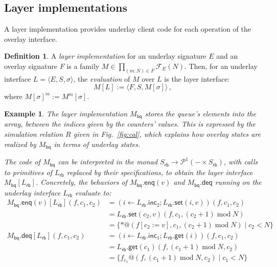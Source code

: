 \documentclass[11pt,oneside,draft]{book}
\newtheorem{example}[theorem]{Example}
\theoremstyle{definition}
\newtheorem{definition}[theorem]{Definition}
\newcommand{\kw}[1]{\ensuremath{ \mathsf{#1} }}
\begin{document}

\subsection{Layer implementations} %

A layer implementation provides underlay client code
for each operation of the overlay interface.

\begin{definition}
A \emph{layer implementation}
for an underlay signature $E$ and
an overlay signature $F$
is a family $M \in \prod_{(m:N) \in F} \mathcal{F}_E(N)$.
Then,
for an underlay interface $L = \langle E, S, \sigma \rangle$,
the \emph{evaluation} of $M$ over $L$ is
the layer interface:
\[
  M[L] := \langle F, S, M[\sigma] \rangle \,,
\]
where $M[\sigma]^m := M^m[\sigma]$.
\end{definition}

\begin{example} \label{ex:bqimpl} %
The layer implementation $M_\kw{bq}$ 
stores the queue's elements into the array,
between the indices given by the counters' values.
This is expressed by the simulation relation $R$
given in Fig.~\ref{fig:cal},
which explains how overlay states are realized by $M_\kw{bq}$ 
in terms of underlay states.

The code of $M_\kw{bq}$ can be interpreted in the monad
$
    S_\kw{rb} \rightarrow \mathcal{P}^1(- \times S_\kw{rb})
$,
with calls to primitives of $L_\kw{rb}$
replaced by their specifications,
to obtain the layer interface $M_\kw{bq}[L_\kw{rb}]$.
Concretely,
the behaviors of $M_\kw{bq}.\kw{enq}(v)$ and $M_\kw{bq}.\kw{deq}$
running on the underlay interface $L_\kw{rb}$
evaluate to:
\begin{align*}
  M_\kw{bq}.{\kw{enq}(v)}[L_\kw{rb}](f, c_1, c_2)
    &= (i \leftarrow L_\kw{rb}.\kw{inc}_2 \mathop{;}
        L_\kw{rb}.\kw{set}(i, v))(f, c_1, c_2) \\
    &= L_\kw{rb}.\kw{set}(c_2, v)(f, c_1,
          (c_2 + 1) \mathop{\mathrm{mod}} N) \\
    &= \{ *@(f[c_2 := v], c_1, (c_2 + 1) \mathop{\mathrm{mod}} N) \mid
          c_2 < N \}
  \\[1em]
  M_\kw{bq}.\kw{deq}[L_\kw{rb}](f, c_1, c_2)
    &= (i \leftarrow L_\kw{rb}.\kw{inc}_1 \mathop{;}
        L_\kw{rb}.\kw{get}(i))(f, c_1, c_2) \\
    &= L_\kw{rb}.\kw{get}(c_1)(f,
          (c_1 + 1) \mathop{\mathrm{mod}} N,
          c_2) \\
    &= \{ f_{c_1}@(f, 
          (c_1 + 1) \mathop{\mathrm{mod}} N,
          c_2) \mid
          c_1 < N \}
\end{align*}
\end{example}
\end{document}
